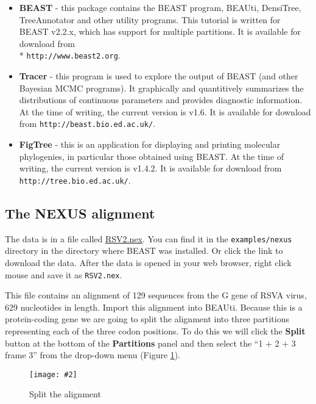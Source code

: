 \documentclass[12pt]{article}
\newcommand{\includeimage}[2][]{%
\texttt{[image: \#2]}
}
\newcommand{\BEASTVersion}{2.2.x}
\newcommand{\TracerVersion}{1.6}
\newcommand{\FigTreeVersion}{1.4.2}
\begin{document}
\begin{itemize}
\item {\bf BEAST} - this package contains the BEAST program, BEAUti, DensiTree, TreeAnnotator and other utility programs. This tutorial is written for BEAST v{\BEASTVersion}, which has support for multiple partitions. It is available for download from \\* \texttt{http://www.beast2.org}.
\item {\bf Tracer} - this program is used to explore the output of BEAST (and other Bayesian MCMC programs). It graphically and
quantitively summarizes the distributions of continuous parameters and provides diagnostic information. At the time of
writing, the current version is v{\TracerVersion}. It is available for download from \texttt{http://beast.bio.ed.ac.uk/}.
\item {\bf FigTree} - this is an application for displaying and printing molecular phylogenies, in particular those obtained using
BEAST. At the time of writing, the current version is v{\FigTreeVersion}. It is available for download from \texttt{http://tree.bio.ed.ac.uk/}.
\end{itemize}

\subsection*{The NEXUS alignment}
The data is in a file called \href{https://github.com/CompEvol/beast2/blob/master/examples/nexus/RSV2.nex?raw=true}{RSV2.nex}. You can find it in the {\tt examples/nexus} directory in the directory where BEAST was installed. Or click the link to download the data. After the data is opened in your web browser, right click mouse and save it as \texttt{RSV2.nex}.

This file contains an alignment of 129 sequences from the G gene of RSVA virus, 629 nucleotides in length. Import this alignment into BEAUti. Because this is a protein-coding gene we are going to split the alignment into three partitions representing each of the three codon positions. To do this we will click the {\bf Split} button at the bottom of the {\bf Partitions} panel and then select the ``1 + 2 + 3 frame 3'' from the drop-down menu (Figure \ref{fig:BEAUti_split}). 

\begin{figure}
\centering	
\includeimage[width=0.6\textwidth]{figures/BEAUti_split}
\label{fig:BEAUti_split}
\caption{Split the alignment}
\end{figure}
\end{document}
